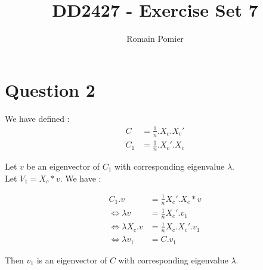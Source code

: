 \documentclass[a4paper,11pt]{article}
\title{\textbf{DD2427 - Exercise Set 7\bigskip}}
\author{Romain Pomier}
\date{}
\theoremstyle{nonumberplain}
\begin{document}
\maketitle

\section*{Question 2}

We have defined :
\begin{align*}
C &= \frac{1}{n} . X_{c} . X_{c}'\\
C_{1} &= \frac{1}{n} . X_{c}' . X_{c}
\end{align*}

Let $v$ be an eigenvector of $C_{1}$ with corresponding eigenvalue $\lambda$.\\
Let $V_{1} = X_{c} * v$. We have :

\begin{align*}
C_{1} . v &= \frac{1}{n} X_{c}' . X_{c} * v\\
\Leftrightarrow \lambda v &= \frac{1}{n} X_{c}' . v_{1}\\
\Leftrightarrow \lambda X_{c} . v &= \frac{1}{n} X_{c} . X_{c}' . v_{1}\\
\Leftrightarrow \lambda v_{1} &= C . v_{1}
\end{align*}

Then $v_{1}$ is an eigenvector of $C$ with corresponding eigenvalue $\lambda$.
\end{document}
